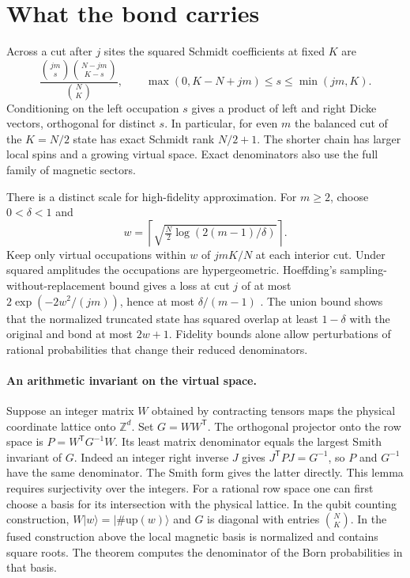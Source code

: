 \documentclass[11pt]{article}
\begin{document}
\newpage
\section*{What the bond carries}
Across a cut after $j$ sites the squared Schmidt coefficients at fixed $K$ are
\[
 \frac{\binom{jm}{s}\binom{N-jm}{K-s}}{\binom NK},\qquad
 \max(0,K-N+jm)\le s\le\min(jm,K).
\]
Conditioning on the left occupation $s$ gives a product of left and right Dicke vectors, orthogonal for distinct $s$. In particular, for even $m$ the balanced cut of the $K=N/2$ state has exact Schmidt rank $N/2+1$. The shorter chain has larger local spins and a growing virtual space. Exact denominators also use the full family of magnetic sectors.

There is a distinct scale for high-fidelity approximation. For $m\ge2$, choose $0<\delta<1$ and
\[
 w=\left\lceil \sqrt{\tfrac{N}{2}\log(2(m-1)/\delta)}\right\rceil .
\]
Keep only virtual occupations within $w$ of $jmK/N$ at each interior cut. Under squared amplitudes the occupations are hypergeometric. Hoeffding's sampling-without-replacement bound gives a loss at cut $j$ of at most $2\exp(-2w^2/(jm))$, hence at most $\delta/(m-1)$ \cite{hoeffding}. The union bound shows that the normalized truncated state has squared overlap at least $1-\delta$ with the original and bond at most $2w+1$. Fidelity bounds alone allow perturbations of rational probabilities that change their reduced denominators.

\paragraph{An arithmetic invariant on the virtual space.}
Suppose an integer matrix $W$ obtained by contracting tensors maps the physical coordinate lattice onto $\mathbb Z^d$. Set $G=WW^{\mathsf T}$. The orthogonal projector onto the row space is $P=W^{\mathsf T}G^{-1}W$. Its least matrix denominator equals the largest Smith invariant of $G$. Indeed an integer right inverse $J$ gives $J^{\mathsf T}PJ=G^{-1}$, so $P$ and $G^{-1}$ have the same denominator. The Smith form gives the latter directly. This lemma requires surjectivity over the integers. For a rational row space one can first choose a basis for its intersection with the physical lattice. In the qubit counting construction, $W|w\rangle=|\#\mathrm{up}(w)\rangle$ and $G$ is diagonal with entries $\binom NK$. In the fused construction above the local magnetic basis is normalized and contains square roots. The theorem computes the denominator of the Born probabilities in that basis.
\end{document}
